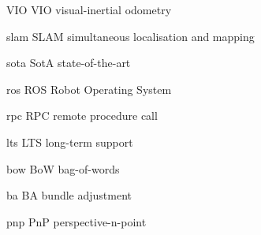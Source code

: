 \newacronym
    {VIO}
    {VIO}
    {visual-inertial odometry}

\newacronym
    {slam}
    {SLAM}
    {simultaneous localisation and mapping}

\newacronym
    {sota}
    {SotA}
    {state-of-the-art}

\newacronym
    {ros}
    {ROS}
    {Robot Operating System}

\newacronym
    {rpc}
    {RPC}
    {remote procedure call}

\newacronym
    {lts}
    {LTS}
    {long-term support}

\newacronym
    {bow}
    {BoW}
    {bag-of-words}

\newacronym
    {ba}
    {BA}
    {bundle adjustment}

\newacronym
    {pnp}
    {PnP}
    {perspective-n-point}

